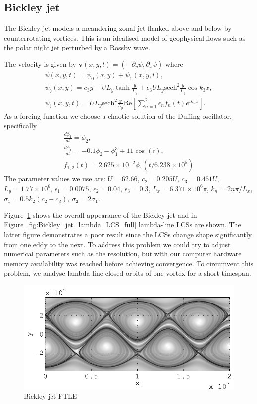 \documentclass{article}
\begin{document}
\clearpage

\subsection{Bickley jet}

The Bickley jet models a meandering zonal jet flanked above and below by
counterrotating vortices. This is an idealised model of geophysical flows
such as the polar night jet perturbed by a Rossby
wave\parencite{haller12:_geodes_theor_trans_barrier_two_dimen_flows,beron-vera10:_invar_lagran}.

The velocity is given by $\boldsymbol{v}(x,y,t) = (-\partial_y \psi, \partial_x \psi)$ where
\begin{gather*}
\psi(x,y,t) = \psi_0(x,y) + \psi_1(x,y,t),\\
\psi_0(x,y) = c_3 y - U L_y \tanh\frac{y}{L_y} + \epsilon_3 U L_y \mathrm{sech}^2\frac{y}{L_y} \cos k_3 x,\\
\psi_1(x,y,t) = U L_y \mathrm{sech}^2\frac{y}{L_y} \mathrm{Re}\left[ \sum_{n=1}^2 \epsilon_n f_n(t) e^{i k_n x}\right].
\end{gather*}
As a forcing function we choose a chaotic solution of the Duffing oscillator, specifically
\begin{gather*}
\frac{d \phi_1}{dt} = \phi_2,\\
\frac{d \phi_1}{dt} = -0.1 \phi_2 - \phi_1^3 + 11 \cos(t),\\
f_{1,2}(t) = 2.625 \times 10^{-2} \phi_1(t/6.238 \times 10^5)
\end{gather*}
The parameter values we use are: $U = 62.66$, $c_2 = 0.205 U$, $c_3 = 0.461 U$, $L_y = 1.77 \times 10^6$, $\epsilon_1 = 0.0075$, $\epsilon_2 = 0.04$, $\epsilon_3 = 0.3$, $L_x = 6.371 \times 10^6 \pi$, $k_n = 2 n \pi/L_x$, $\sigma_1 = 0.5 k_2 (c_2 - c_3)$, $\sigma_2 = 2 \sigma_1$.

Figure~\ref{fig:Bickley_jet_FTLE} shows the overall appearance of the Bickley jet and in Figure~\ref{fig:Bickley_jet_lambda_LCS_full} lambda-line LCSs are shown. The latter figure demonstrates a poor result since the LCSs change shape significantly from one eddy to the next. To address this problem we could try to adjust numerical parameters such as the resolution, but with our computer hardware memory availability was reached before achieving convergence. To circumvent this problem, we analyse lambda-line closed orbits of one vortex for a short timespan.

\begin{figure}
  \centering
  \includegraphics[width=.85\textwidth]{graphics/bickley_jet/ftle_overview}
  \caption{Bickley jet FTLE}
  \label{fig:Bickley_jet_FTLE}
\end{figure}
\end{document}

